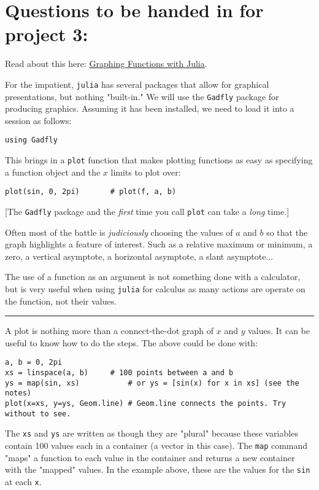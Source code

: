 \documentclass[12pt]{article}
\begin{document}
\section{Questions to be handed in for project 3:}

Read about this here:
\href{http://mth229.github.io/graphing.html}{Graphing Functions with
Julia}.

For the impatient, \texttt{julia} has several packages that allow for
graphical presentations, but nothing "built-in." We will use the
\texttt{Gadfly} package for producing graphics. Assuming it has been
installed, we need to load it into a session as follows:



\begin{verbatim}
using Gadfly 
\end{verbatim}
This brings in a \texttt{plot} function that makes plotting functions as
easy as specifying a function object and the $x$ limits to plot over:



\begin{verbatim}
plot(sin, 0, 2pi)       # plot(f, a, b)
\end{verbatim}
{[}The \texttt{Gadfly} package and the \emph{first} time you call
\texttt{plot} can take a \emph{long} time.{]}

Often most of the battle is \emph{judiciously} choosing the values of
$a$ and $b$ so that the graph highlights a feature of interest. Such as
a relative maximum or minimum, a zero, a vertical asymptote, a
horizontal asymptote, a slant asymptote...

The use of a function as an argument is not something done with a
calculator, but is very useful when using \texttt{julia} for calculus as
many actions are operate on the function, not their values.

\begin{center}\rule{3in}{0.4pt}\end{center}

A plot is nothing more than a connect-the-dot graph of $x$ and $y$
values. It can be useful to know how to do the steps. The above could be
done with:



\begin{verbatim}
a, b = 0, 2pi
xs = linspace(a, b)     # 100 points between a and b
ys = map(sin, xs)           # or ys = [sin(x) for x in xs] (see the notes)
plot(x=xs, y=ys, Geom.line) # Geom.line connects the points. Try without to see.
\end{verbatim}
The \texttt{xs} and \texttt{ys} are written as though they are "plural"
because these variables contain 100 values each in a container (a vector
in this case). The \texttt{map} command "maps" a function to each value
in the container and returns a new container with the "mapped" values.
In the example above, these are the values for the \texttt{sin} at each
\texttt{x}.
\end{document}
